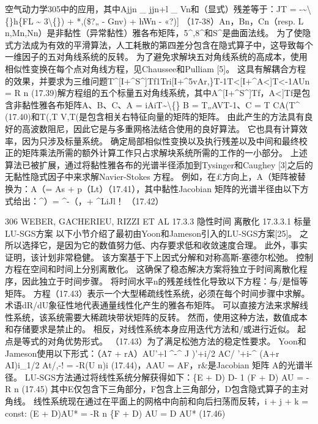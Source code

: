 \documentclass[UTF8,11pt,a4paper,openany,fontset=fandol]{ctexbook}
\begin{document}
空气动力学305中的应用，其中Ajjn \_ jjn+l \_ Vn和（显式）残差等于：JT = -\textasciitilde{}\textbackslash\{\}h\{FL \textasciitilde{} 3\textbackslash\{\}) + *,(\$?„ - Gnv) + hWn - «?)] （17-38）An，Bn，Cn（resp. L n,Mn,Nn）是非黏性（异常黏性）雅各布矩阵，5\textasciicircum{},8\textasciicircum{}和S\textasciicircum{}是曲面法线。 为了使隐式方法成为有效的平滑算法，人工耗散的第四差分包含在隐式算子中，这导致每个一维因子的五对角线系统的反转。 为了避免求解块五对角线系统的高成本，使用相似性变换在每个点对角线方程，见Chaussee和Pulliam [5]。 这具有解耦合方程的效果，并要求为三维问题T\textasciicircum{}[I+\textasciicircum{}S\textasciicircum{}]Tf1Tri[I+\textasciicircum{}5vAr,\}T-1T<[I+\textasciicircum{}A<]T<-1AUn = R n (17.39)解方程组的五个标量五对角线系统，其中A\textasciicircum{}[I+\textasciicircum{}S\textasciicircum{}]Tf，A<]Tf是包含非黏性雅各布矩阵A、B、C、A = iAiT\textasciitilde{}\textbackslash\{\} B = T„AVT-1、C = T CA(T\textasciicircum{} (17.40)和T(,T V,T(是包含相关右特征向量的矩阵的矩阵。 由此产生的方法具有良好的高波数阻尼，因此它是与多重网格法结合使用的良好算法。 它也具有计算效率，因为只涉及标量系统。 确定局部相似性变换以及执行残差以及中间和最终校正的矩阵乘法所需的额外计算工作只占求解块系统所需的工作的一小部分。 上述算法已被扩展，通过将黏性雅各布的光谱半径添加到Tysinger和Caughey [3]之后的无黏性隐式因子中来求解Navier-Stokes 方程。 例如，在£方向上，A（矩阵被替换为：A（= As + p（Lt）（17.41），其中黏性Jacobian 矩阵的光谱半径由以下方式给出：\textasciicircum{}）= \textasciicircum{}-（，+ \textasciicircum{}LiJl！ （17.42）

306 WEBER, GACHERIEU, RIZZI ET AL 17.3.3 隐性时间 离散化 17.3.3.1 标量LU-SGS方案 以下小节介绍了最初由Yoon和Jameson引入的LU-SGS方案[25]。 之所以选择它，是因为它的数值努力低、内存要求低和收敛速度合理。 此外，事实证明，该计划非常稳健。 该方案基于下上因式分解和对称高斯-塞德尔松弛。 控制方程在空间和时间上分别离散化。 这确保了稳态解决方案将独立于时间离散化程序，因此独立于时间步骤。 将时间水平n的残差线性化导致以下方程：与/是恒等矩阵。 方程（17.43）表示一个大型稀疏线性系统，必须在每个时间步骤中求解。 术语dR/dU象征性地代表通量线性化产生的雅各布矩阵。 可以直接方法来求解线性系统，该系统需要大稀疏块带状矩阵的反转。 然而，使用这种方法，数值成本和存储要求是禁止的。 相反，对线性系统本身应用迭代方法和/或进行近似。 起点是等式的对角优势形式。 （17.43）为了满足松弛方法的稳定性要求。 Yoon和Jameson使用以下形式：（A7 + rA）AU'+l \textasciicircum{}-\textasciicircum{} J )'+i/2 AC/ '+i-\textasciicircum{} (A+r AI)i\_1/2 At/,-! = -R(U n)i (17.44)，AAU = AF，r\&是Jacobian 矩阵 A的光谱半径。 LU-SGS方法通过将线性系统分解获得如下：\{E + D) D- 1 (F + D) AU = -R n (17.45) 其中E仅包含下三角部分，F包含上三角部分，D包含隐式算子的主对角线。 线性系统现在通过在平面上的网格中向前和向后扫荡而反转，i + j + k = const: (E + D)AU* = -R n \{F + D) AU = D AU* (17.46)
\end{document}
